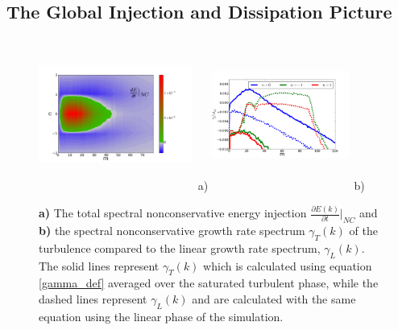 \documentclass[twocolumn,showpacs,preprintnumbers,amsmath,amssymb]{revtex4}
\newcommand{\pdiff}[2]{\frac{\partial#1}{\partial#2}}
\begin{document}
\subsection{The Global Injection and Dissipation Picture}

\begin{figure}
\includegraphics[width=0.45\textwidth,height=50mm]{dEdt_nc}~a)
\hfil
\includegraphics[width=0.40\textwidth,height=50mm]{lin_vs_nl_standard}~b)
\hfil
\caption{\textbf{a)} The total spectral nonconservative energy injection $\pdiff{E(k)}{t} \big|_{NC}$ and
\textbf{b)} the spectral nonconservative growth rate spectrum $\gamma_{T}(k)$ of the turbulence 
compared to the linear growth rate spectrum, $\gamma_L(k)$. The solid lines represent $\gamma_{T}(k)$ which is calculated using equation \ref{gamma_def} averaged over the saturated turbulent phase, 
while the dashed lines represent $\gamma_L(k)$ and are calculated with the same equation using the linear phase of the simulation.}
\label{dEdt_tot_fig}
\end{figure}
\end{document}
